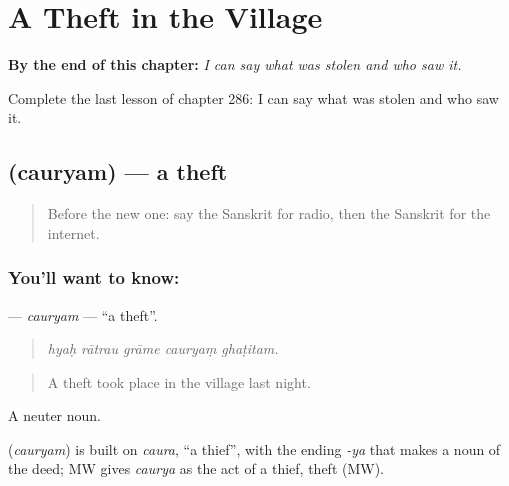 
\chapter{A Theft in the Village}
\label{ch:sa-a-theft-in-the-village}

\begin{chapteropening}
\textbf{By the end of this chapter:} \emph{I can say what was stolen and who saw it.}

Complete the last lesson of chapter 286: I can say what was stolen and who saw it.
\end{chapteropening}

\section[\texorpdfstring{\sk{चौर्यम्} (cauryam)}{चौर्यम् (cauryam)}]{ (cauryam) — a theft}

\label{lesson:SA-C286-cauryam}



\begin{quote}
Before the new one: say the Sanskrit for radio, then the Sanskrit for the internet.
\end{quote}

\subsection*{You'll want to know: }
\textbf{} — \emph{cauryam} — \textquotedblleft{}a theft\textquotedblright{}.

\begin{quote}
    
\end{quote}

\begin{quote}
\emph{hyaḥ rātrau grāme cauryaṃ ghaṭitam.}
\end{quote}

\begin{quote}
A theft took place in the village last night.
\end{quote}

A neuter noun.

\begin{cousinweb}
\textbf{} (\emph{cauryam}) is built on \emph{caura}, \textquotedblleft{}a thief\textquotedblright{}, with the ending \emph{-ya} that makes a noun of the deed; MW gives \emph{caurya} as the act of a thief, theft (MW).
\end{cousinweb}

